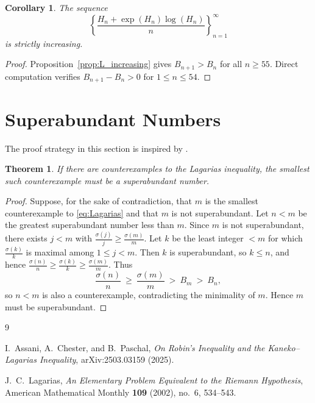 \documentclass{article}
\newtheorem{corollary}{Corollary}[section]
\newtheorem{theorem}{Theorem}[section]
\begin{document}
\begin{corollary}\label{cor:Bn_strict}
The sequence
\begin{equation}\label{seq_mon_inc}
\left\{ \frac{H_n+\exp(H_n)\log(H_n)}{n} \right\}_{n=1}^{\infty}
\end{equation}
is strictly increasing.
\end{corollary}

\begin{proof}
Proposition~\ref{prop:L_increasing} gives $B_{n+1}>B_n$ for all $n\ge 55$.
Direct computation verifies $B_{n+1}-B_n>0$ for $1\le n\le 54$.
\end{proof}

\section{Superabundant Numbers}

The proof strategy in this section is inspired by \cite{AssaniChesterPaschal2025}.

\begin{theorem}\label{thm:SA_reduction}
If there are counterexamples to the Lagarias inequality, the smallest such counterexample must be a superabundant number.
\end{theorem}

\begin{proof}
Suppose, for the sake of contradiction, that $m$ is the smallest counterexample to \eqref{eq:Lagarias} and that $m$ is not superabundant. Let $n<m$ be the greatest superabundant number less than $m$. Since $m$ is not superabundant, there exists $j<m$ with $\frac{\sigma(j)}{j}\ge \frac{\sigma(m)}{m}$.
Let $k$ be the least integer $<m$ for which $\frac{\sigma(k)}{k}$ is maximal among $1\le j<m$.
Then $k$ is superabundant, so $k\le n$, and hence $\frac{\sigma(n)}{n}\ge \frac{\sigma(k)}{k}\ge \frac{\sigma(m)}{m}$. Thus
\[
\frac{\sigma(n)}{n}\ \ge\ \frac{\sigma(m)}{m}\ >\ B_m\ >\ B_n,
\]
so $n<m$ is also a counterexample, contradicting the minimality of $m$.
Hence $m$ must be superabundant.
\end{proof}

\begin{thebibliography}{9}

I.~Assani, A.~Chester, and B.~Paschal,
\emph{On Robin's Inequality and the Kaneko--Lagarias Inequality},
arXiv:2503.03159 (2025).

J.~C.~Lagarias,
\emph{An Elementary Problem Equivalent to the Riemann Hypothesis},
American Mathematical Monthly \textbf{109} (2002), no.~6, 534--543.

\end{thebibliography}
\end{document}

